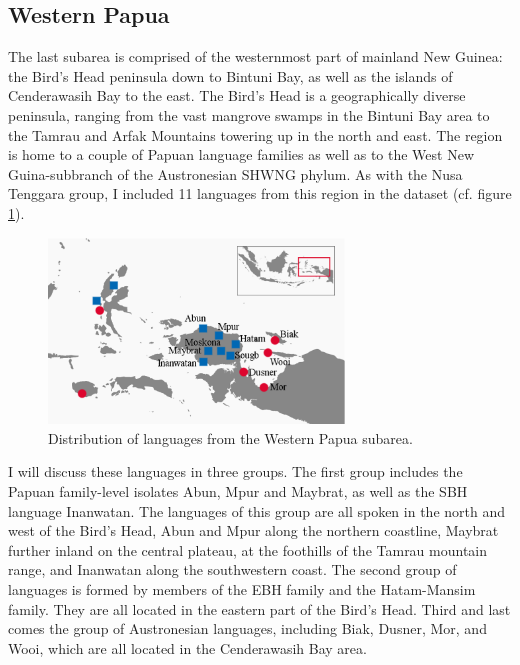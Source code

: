 \subsection{Western Papua}\label{sec:westpapua2}

The last subarea is comprised of the westernmost part of mainland New Guinea: the Bird's Head peninsula down to Bintuni Bay, as well as the islands of Cenderawasih Bay to the east. The Bird's Head is a geographically diverse peninsula, ranging from the vast mangrove swamps in the Bintuni Bay area to the Tamrau and Arfak Mountains towering up in the north and east. The region is home to a couple of Papuan language families as well as to the West New Guina-subbranch of the Austronesian SHWNG phylum. As with the Nusa Tenggara group, I included 11 languages from this region in the dataset (cf. figure \ref{map:Pap}). 

\begin{figure}

\includegraphics[width=0.7\textwidth]{figures/Map_Papua2.eps}
\caption{Distribution of languages from the Western Papua subarea.}\label{map:Pap}

\end{figure}

I will discuss these languages in three groups. The first group includes the Papuan family-level isolates Abun, Mpur and Maybrat, as well as the \textsc{SBH} language Inanwatan. The languages of this group are all spoken in the north and west of the Bird's Head, Abun and Mpur along the northern coastline, Maybrat further inland on the central plateau, at the foothills of the Tamrau mountain range, and Inanwatan along the southwestern coast. The second group of languages is formed by members of the EBH family and the Hatam-Mansim family. They are all located in the eastern part of the Bird's Head. Third and last comes the group of Austronesian languages, including Biak, Dusner, Mor, and Wooi, which are all located in the Cenderawasih Bay area.

